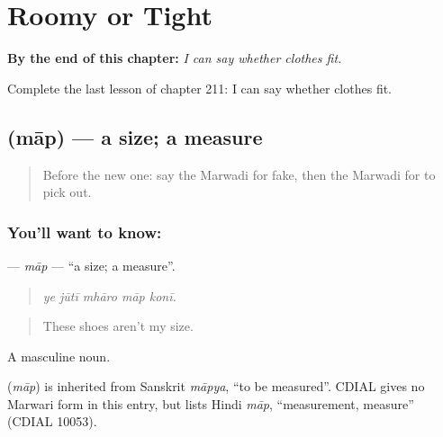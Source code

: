 
\chapter{Roomy or Tight}
\label{ch:mw-roomy-or-tight}

\begin{chapteropening}
\textbf{By the end of this chapter:} \emph{I can say whether clothes fit.}

Complete the last lesson of chapter 211: I can say whether clothes fit.
\end{chapteropening}

\section[\texorpdfstring{\mw{माप} (māp)}{माप (māp)}]{ (māp) — a size; a measure}

\label{lesson:MW-C211-map}



\begin{quote}
Before the new one: say the Marwadi for fake, then the Marwadi for to pick out.
\end{quote}

\subsection*{You'll want to know: }
\textbf{} — \emph{māp} — \textquotedblleft{}a size; a measure\textquotedblright{}.

\begin{quote}
    
\end{quote}

\begin{quote}
\emph{ye jūtī mhāro māp konī.}
\end{quote}

\begin{quote}
These shoes aren't my size.
\end{quote}

A masculine noun.

\begin{cousinweb}
\textbf{} (\emph{māp}) is inherited from Sanskrit \emph{māpya}, \textquotedblleft{}to be measured\textquotedblright{}. CDIAL gives no Marwari form in this entry, but lists Hindi \emph{māp}, \textquotedblleft{}measurement, measure\textquotedblright{} (CDIAL 10053).
\end{cousinweb}

